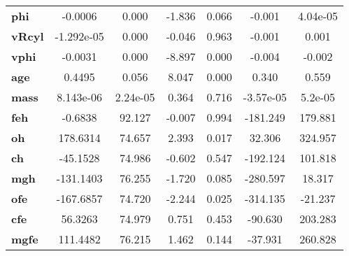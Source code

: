 \begin{center}
\begin{tabular}{lcccccc}
\textbf{phi}       &      -0.0006  &        0.000     &    -1.836  &         0.066        &       -0.001    &     4.04e-05     \\
\textbf{vRcyl}     &   -1.292e-05  &        0.000     &    -0.046  &         0.963        &       -0.001    &        0.001     \\
\textbf{vphi}      &      -0.0031  &        0.000     &    -8.897  &         0.000        &       -0.004    &       -0.002     \\
\textbf{age}       &       0.4495  &        0.056     &     8.047  &         0.000        &        0.340    &        0.559     \\
\textbf{mass}      &    8.143e-06  &     2.24e-05     &     0.364  &         0.716        &    -3.57e-05    &      5.2e-05     \\
\textbf{feh}       &      -0.6838  &       92.127     &    -0.007  &         0.994        &     -181.249    &      179.881     \\
\textbf{oh}        &     178.6314  &       74.657     &     2.393  &         0.017        &       32.306    &      324.957     \\
\textbf{ch}        &     -45.1528  &       74.986     &    -0.602  &         0.547        &     -192.124    &      101.818     \\
\textbf{mgh}       &    -131.1403  &       76.255     &    -1.720  &         0.085        &     -280.597    &       18.317     \\
\textbf{ofe}       &    -167.6857  &       74.720     &    -2.244  &         0.025        &     -314.135    &      -21.237     \\
\textbf{cfe}       &      56.3263  &       74.979     &     0.751  &         0.453        &      -90.630    &      203.283     \\
\textbf{mgfe}      &     111.4482  &       76.215     &     1.462  &         0.144        &      -37.931    &      260.828     \\
\bottomrule
\end{tabular}
\end{center}